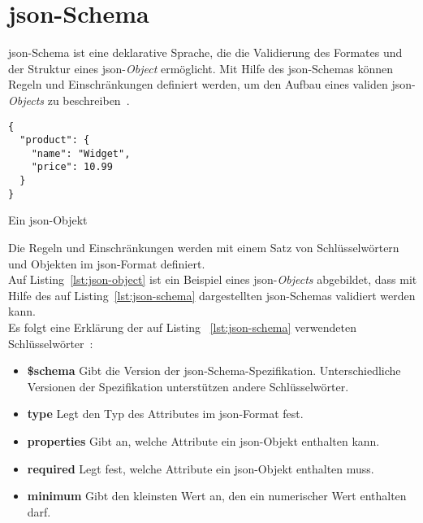 \section{\acs{json}-Schema}\label{sec:json-schema}

\acs{json}-Schema ist eine deklarative Sprache, die die Validierung des Formates und der Struktur eines \ac{json}-\textit{Object} ermöglicht.
Mit Hilfe des \acs{json}-Schemas können Regeln und Einschränkungen definiert werden, um den Aufbau eines validen \ac{json}-\textit{Objects} zu beschreiben~\cite{json-schema-description}.

\begin{listing}[htp]
      \begin{verbatim}
{
  "product": {
    "name": "Widget",
    "price": 10.99
  }
}
      \end{verbatim}
      \caption{Ein \acs{json}-Objekt}
      \label{lst:json-object}
\end{listing}

Die Regeln und Einschränkungen werden mit einem Satz von Schlüsselwörtern und Objekten im \acs{json}-Format definiert.
\\
Auf Listing~\ref{lst:json-object} ist ein Beispiel eines \acs{json}-\textit{Objects} abgebildet, dass mit Hilfe des auf Listing~\ref{lst:json-schema}
dargestellten \acs{json}-Schemas validiert werden kann.
\\
Es folgt eine Erklärung der auf Listing ~\ref{lst:json-schema} verwendeten Schlüsselwörter~\cite{json-schema-creation}:

\begin{itemize}
      \setlength\itemsep{-0.5cm}
      \item
            \textbf{\$schema} Gibt die Version der \acs{json}-Schema-Spezifikation. Unterschiedliche Versionen der Spezifikation
            unterstützen andere Schlüsselwörter.
      \item
            \textbf{type} Legt den Typ des Attributes im \acs{json}-Format fest.
      \item
            \textbf{properties} Gibt an, welche Attribute ein \acs{json}-Objekt enthalten kann.
      \item
            \textbf{required} Legt fest, welche Attribute ein \acs{json}-Objekt enthalten muss.
      \item
            \textbf{minimum} Gibt den kleinsten Wert an, den ein numerischer Wert enthalten darf.
\end{itemize}

